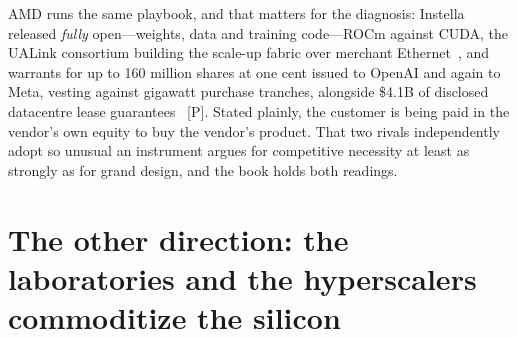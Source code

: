 AMD runs the same playbook, and that matters for the diagnosis: Instella released \emph{fully} open---weights, data and training code---ROCm against CUDA, the UALink consortium building the scale-up fabric over merchant Ethernet~\cite{amd-open}, and warrants for up to 160 million shares at one cent issued to OpenAI and again to Meta, vesting against gigawatt purchase tranches, alongside \$4.1B of disclosed datacentre lease guarantees~\cite{amd-warrants,amd-q2-2026} [P]. Stated plainly, the customer is being paid in the vendor's own equity to buy the vendor's product. That two rivals independently adopt so unusual an instrument argues for competitive necessity at least as strongly as for grand design, and the book holds both readings.

\section{The other direction: the laboratories and the hyperscalers commoditize the silicon}


